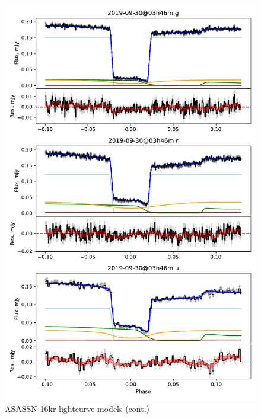 \begin{figure}
    \centering
    \includegraphics[width=\textwidth]{figures/results/three_cvs_with_weird_colours/ASASSN-16kr/ASASSN-16kr_7.pdf}
    \caption{ASASSN-16kr lightcurve models (cont.)}
    \label{fig:ASASSN-16kr all lightcurves cont 6}
\end{figure}



